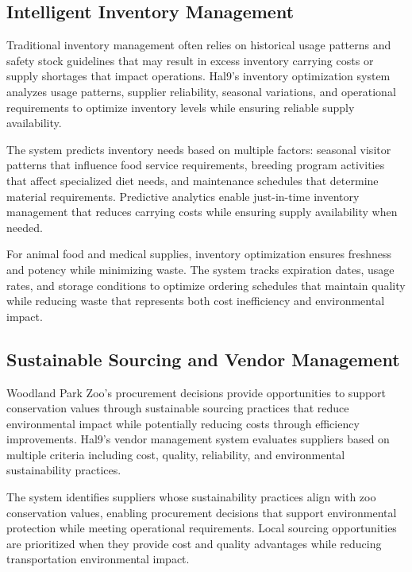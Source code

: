 \documentclass[
  Letterpaper,
]{scrbook}
\begin{document}
\subsection{Intelligent Inventory
Management}\label{intelligent-inventory-management}

Traditional inventory management often relies on historical usage
patterns and safety stock guidelines that may result in excess inventory
carrying costs or supply shortages that impact operations. Hal9's
inventory optimization system analyzes usage patterns, supplier
reliability, seasonal variations, and operational requirements to
optimize inventory levels while ensuring reliable supply availability.

The system predicts inventory needs based on multiple factors: seasonal
visitor patterns that influence food service requirements, breeding
program activities that affect specialized diet needs, and maintenance
schedules that determine material requirements. Predictive analytics
enable just-in-time inventory management that reduces carrying costs
while ensuring supply availability when needed.

For animal food and medical supplies, inventory optimization ensures
freshness and potency while minimizing waste. The system tracks
expiration dates, usage rates, and storage conditions to optimize
ordering schedules that maintain quality while reducing waste that
represents both cost inefficiency and environmental impact.

\subsection{Sustainable Sourcing and Vendor
Management}\label{sustainable-sourcing-and-vendor-management}

Woodland Park Zoo's procurement decisions provide opportunities to
support conservation values through sustainable sourcing practices that
reduce environmental impact while potentially reducing costs through
efficiency improvements. Hal9's vendor management system evaluates
suppliers based on multiple criteria including cost, quality,
reliability, and environmental sustainability practices.

The system identifies suppliers whose sustainability practices align
with zoo conservation values, enabling procurement decisions that
support environmental protection while meeting operational requirements.
Local sourcing opportunities are prioritized when they provide cost and
quality advantages while reducing transportation environmental impact.
\end{document}
